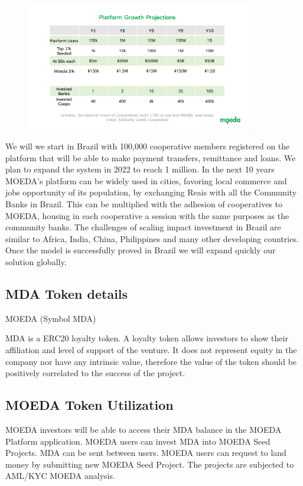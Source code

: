 \documentclass{article}
\begin{document}
\begin{figure}[h]
    \centering
    \includegraphics[width=10cm,keepaspectratio]{grow}
\end{figure}

We will we start in Brazil with 100,000 cooperative members registered on the platform that will be able to make payment transfers, remittance and loans. We plan to expand the system in 2022 to reach 1 million.
In the next 10 years MOEDA’s platform can be widely used in cities, favoring local commerce and jobs opportunity of its population, by exchanging Reais with all the Community Banks in Brazil. This can be multiplied with the adhesion of cooperatives to MOEDA, housing in each cooperative a session with the same purposes as the community banks.
The challenges of scaling impact investment in Brazil are similar to Africa, India, China, Philippines and many other developing countries. Once the model is successfully proved in Brazil we will expand quickly our solution globally.


\subsection{MDA Token details}

MOEDA (Symbol MDA) 

MDA is a ERC20 loyalty token.  A loyalty token allows investors to show their affiliation and level of support of the venture.  It does not represent equity in the company nor have any intrinsic value, therefore the value of the token should be positively correlated to the success of the project.

\subsection {MOEDA Token Utilization}

MOEDA investors will be able to access their MDA balance in the MOEDA Platform application. MOEDA users can invest MDA into MOEDA Seed Projects. MDA can be sent between users.
MOEDA users can request to land money by submitting new MOEDA Seed Project. The projects are subjected to AML/KYC MOEDA analysis.  
\end{document}
